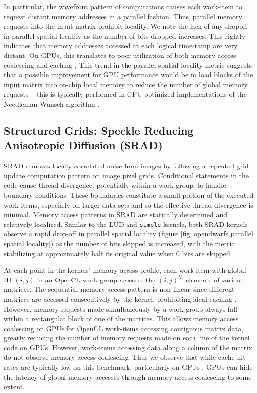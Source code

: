 \documentclass[review=false, sigchi]{acmart}
\begin{document}
	In particular, the wavefront pattern of computations causes each work-item to request distant memory addresses in a parallel fashion. Thus, parallel memory requests into the input matrix prohibit locality. We note the lack of any dropoff in parallel spatial locality as the number of bits dropped increases. This rightly indicates that memory addresses accessed at each logical timestamp are very distant. On GPUs, this translates to poor utilization of both memory access coalescing and caching \cite{krommydas2016opendwarfs}. This trend in the parallel spatial locality metric suggests that a possible improvement for GPU performance would be to load blocks of the input matrix into on-chip local memory to reduce the number of global memory requests -- this is typically performed in GPU optimized implementations of the Needleman-Wunsch algorithm \cite{opendwarfs2020head}. 
	
	\subsection{Structured Grids: Speckle Reducing Anisotropic Diffusion (SRAD)}
	
	SRAD removes locally correlated noise from images by following a repeated grid update computation pattern on image pixel grids. 
	Conditional statements in the code cause thread divergence, potentially within a work-group, to handle boundary conditions. 
	These boundaries constitute a small portion of the executed work-items, especially on larger data-sets and so the effective thread divergence is minimal.
	Memory access patterns in SRAD are statically determined and relatively localized. 
	Similar to the LUD and \texttt{simple} kernels, both SRAD kernels observe a rapid drop-off in parallel spatial locality (figure \ref{fig: opendwarfs parallel spatial locality}) as the number of bits skipped is increased, with the metric stabilizing at approximately half its original value when 0 bits are skipped.
	
	At each point in the kernels' memory access profile, each work-item with global ID $(i,j)$ in an OpenCL work-group accesses the $(i,j)^{th}$ elements of various matrices. The sequential memory access pattern is non-linear since different matrices are accessed consecutively by the kernel, prohibiting ideal caching \cite{krommydas2016opendwarfs}. However, memory requests made simultaneously by a work-group always fall within a rectangular block of one of the matrices. 
	This allows memory access coalescing on GPUs for OpenCL work-items accessing contiguous matrix data, greatly reducing the number of memory requests made on each line of the kernel code on GPUs. 
	However, work-items accessing data along a column of the matrix do not observe memory access coalescing.
	Thus we observe that while cache hit rates are typically low on this benchmark, particularly on GPUs \cite{krommydas2016opendwarfs}, GPUs can hide the latency of global memory accesses through memory access coalescing to some extent.
	
\end{document}
